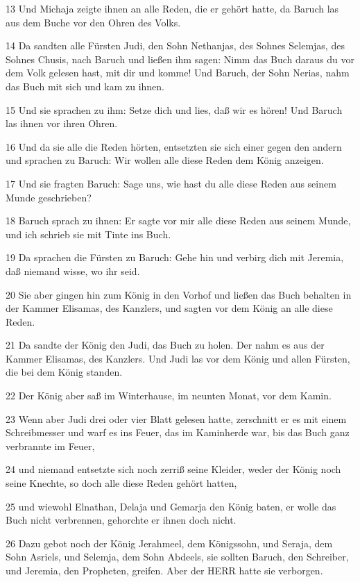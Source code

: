 \par 13 Und Michaja zeigte ihnen an alle Reden, die er gehört hatte, da Baruch las aus dem Buche vor den Ohren des Volks.
\par 14 Da sandten alle Fürsten Judi, den Sohn Nethanjas, des Sohnes Selemjas, des Sohnes Chusis, nach Baruch und ließen ihm sagen: Nimm das Buch daraus du vor dem Volk gelesen hast, mit dir und komme! Und Baruch, der Sohn Nerias, nahm das Buch mit sich und kam zu ihnen.
\par 15 Und sie sprachen zu ihm: Setze dich und lies, daß wir es hören! Und Baruch las ihnen vor ihren Ohren.
\par 16 Und da sie alle die Reden hörten, entsetzten sie sich einer gegen den andern und sprachen zu Baruch: Wir wollen alle diese Reden dem König anzeigen.
\par 17 Und sie fragten Baruch: Sage uns, wie hast du alle diese Reden aus seinem Munde geschrieben?
\par 18 Baruch sprach zu ihnen: Er sagte vor mir alle diese Reden aus seinem Munde, und ich schrieb sie mit Tinte ins Buch.
\par 19 Da sprachen die Fürsten zu Baruch: Gehe hin und verbirg dich mit Jeremia, daß niemand wisse, wo ihr seid.
\par 20 Sie aber gingen hin zum König in den Vorhof und ließen das Buch behalten in der Kammer Elisamas, des Kanzlers, und sagten vor dem König an alle diese Reden.
\par 21 Da sandte der König den Judi, das Buch zu holen. Der nahm es aus der Kammer Elisamas, des Kanzlers. Und Judi las vor dem König und allen Fürsten, die bei dem König standen.
\par 22 Der König aber saß im Winterhause, im neunten Monat, vor dem Kamin.
\par 23 Wenn aber Judi drei oder vier Blatt gelesen hatte, zerschnitt er es mit einem Schreibmesser und warf es ins Feuer, das im Kaminherde war, bis das Buch ganz verbrannte im Feuer,
\par 24 und niemand entsetzte sich noch zerriß seine Kleider, weder der König noch seine Knechte, so doch alle diese Reden gehört hatten,
\par 25 und wiewohl Elnathan, Delaja und Gemarja den König baten, er wolle das Buch nicht verbrennen, gehorchte er ihnen doch nicht.
\par 26 Dazu gebot noch der König Jerahmeel, dem Königssohn, und Seraja, dem Sohn Asriels, und Selemja, dem Sohn Abdeels, sie sollten Baruch, den Schreiber, und Jeremia, den Propheten, greifen. Aber der HERR hatte sie verborgen.

